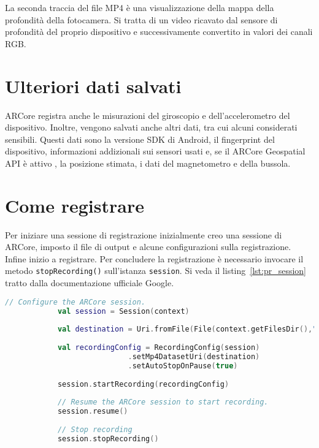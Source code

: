 \documentclass[crop=false, class=book]{standalone}
\begin{document}
	La seconda traccia del file MP4 è una visualizzazione della mappa della profondità della fotocamera. Si tratta di un video ricavato dal sensore di profondità del proprio dispositivo e successivamente convertito in valori dei canali RGB.
	
	\section{Ulteriori dati salvati}
	ARCore registra anche le misurazioni del giroscopio e dell’accelerometro del dispositivo. Inoltre, vengono salvati anche altri dati, tra cui alcuni considerati sensibili. Questi dati sono la versione SDK di Android, il fingerprint del dispositivo, informazioni addizionali sui sensori usati e, se il ARCore Geospatial API è attivo , la posizione stimata, i dati del magnetometro e della bussola.
	 
	\section{Come registrare}
	Per iniziare una sessione di registrazione inizialmente creo una sessione di ARCore, imposto il file di output e alcune configurazioni sulla registrazione. Infine inizio a registrare. Per concludere la registrazione è necessario invocare il metodo \verb|stopRecording()| sull'istanza \verb|session|. Si veda il listing~\vref{lst:pr_session} tratto dalla documentazione ufficiale Google.
	
	\begin{center}
		\begin{minipage}{0.95\textwidth}
			\begin{lstlisting}[caption={Descrizione del listing.}, label={lst:pr_session}, language=Kotlin]
			// Configure the ARCore session.
			val session = Session(context)
			
			val destination = Uri.fromFile(File(context.getFilesDir(),"recording.mp4"))
			
			val recordingConfig = RecordingConfig(session)
							.setMp4DatasetUri(destination)
							.setAutoStopOnPause(true)
			
			session.startRecording(recordingConfig)
			
			// Resume the ARCore session to start recording.
			session.resume()
			
			// Stop recording
			session.stopRecording()
			\end{lstlisting}
		\end{minipage}
	\end{center}	
\end{document}
